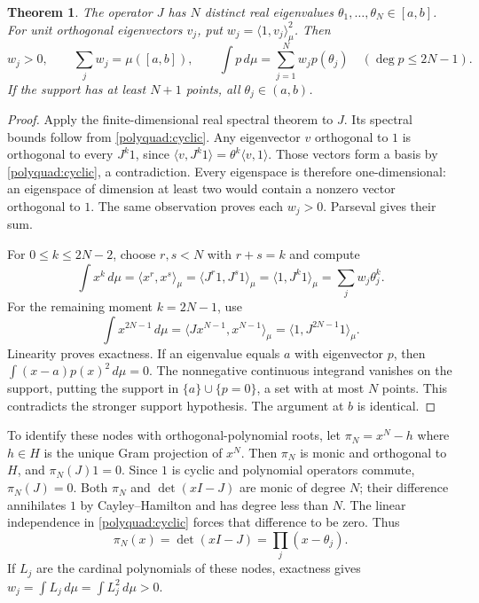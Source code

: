 \documentclass[11pt]{article}
\newtheorem{theorem}{Theorem}[section]
\theoremstyle{remark}
\numberwithin{equation}{section}
\begin{document}
\begin{theorem}
The operator $J$ has $N$ distinct real eigenvalues
$\theta_1,\ldots,\theta_N\in[a,b]$. For unit orthogonal eigenvectors
$v_j$, put $w_j=\langle1,v_j\rangle_\mu^2$. Then
\begin{equation}
 w_j>0,\qquad \sum_jw_j=\mu([a,b]),\qquad
 \int p\,d\mu=\sum_{j=1}^Nw_jp(\theta_j)\quad(\deg p\le2N-1).
 \label{polyquad:gauss-exact}
\end{equation}
If the support has at least $N+1$ points, all $\theta_j\in(a,b)$.
\end{theorem}
\begin{proof}
Apply the finite-dimensional real spectral theorem to $J$. Its spectral
bounds follow from \eqref{polyquad:cyclic}. Any eigenvector $v$
orthogonal to $1$ is orthogonal to every $J^k1$, since
$\langle v,J^k1\rangle=\theta^k\langle v,1\rangle$. Those vectors
form a basis by \eqref{polyquad:cyclic}, a contradiction. Every
eigenspace is therefore one-dimensional: an eigenspace of dimension
at least two would contain a nonzero vector orthogonal to $1$.
The same observation proves each $w_j>0$. Parseval gives their sum.

For $0\le k\le2N-2$, choose $r,s<N$ with $r+s=k$ and compute
\[
 \int x^k\,d\mu=\langle x^r,x^s\rangle_\mu
 =\langle J^r1,J^s1\rangle_\mu
 =\langle1,J^k1\rangle_\mu=\sum_jw_j\theta_j^k.
\]
For the remaining moment $k=2N-1$, use
\[
 \int x^{2N-1}\,d\mu
 =\langle Jx^{N-1},x^{N-1}\rangle_\mu
 =\langle1,J^{2N-1}1\rangle_\mu.
\]
Linearity proves exactness. If an eigenvalue equals $a$ with eigenvector
$p$, then $\int(x-a)p(x)^2\,d\mu=0$. The nonnegative continuous
integrand vanishes on the support, putting the support in
$\{a\}\cup\{p=0\}$, a set with at most $N$ points. This contradicts
the stronger support hypothesis. The argument at $b$ is identical.
\end{proof}

To identify these nodes with orthogonal-polynomial roots, let
$\pi_N=x^N-h$ where $h\in H$ is the unique Gram projection of $x^N$.
Then $\pi_N$ is monic and orthogonal to $H$, and
$\pi_N(J)1=0$. Since $1$ is cyclic and polynomial operators commute,
$\pi_N(J)=0$. Both $\pi_N$ and $\det(xI-J)$ are monic of degree $N$;
their difference annihilates $1$ by Cayley--Hamilton and has degree
less than $N$. The linear independence in \eqref{polyquad:cyclic}
forces that difference to be zero. Thus
\[
 \pi_N(x)=\det(xI-J)=\prod_j(x-\theta_j).
\]
If $L_j$ are the cardinal polynomials of these nodes, exactness gives
$w_j=\int L_j\,d\mu=\int L_j^2\,d\mu>0$.
\end{document}
